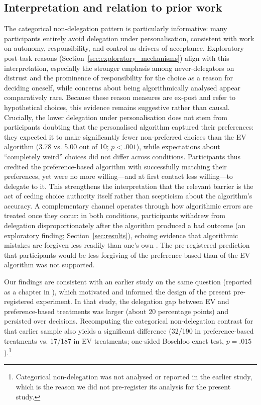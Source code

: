 \documentclass[a4paper, 12pt, fleqn]{article}
\theoremstyle{hypstyle}
\begin{document}
\subsection{Interpretation and relation to prior work}\label{sec:interpretation}
The categorical non-delegation pattern is particularly informative: many participants entirely avoid delegation under personalisation, consistent with work on autonomy, responsibility, and control as drivers of acceptance. Exploratory post-task reasons (Section~\ref{sec:exploratory_mechanisms}) align with this interpretation, especially the stronger emphasis among never-delegators on distrust and the prominence of responsibility for the choice as a reason for deciding oneself, while concerns about being algorithmically analysed appear comparatively rare. Because these reason measures are ex-post and refer to hypothetical choices, this evidence remains suggestive rather than causal. Crucially, the lower delegation under personalisation does not stem from participants doubting that the personalised algorithm captured their preferences: they expected it to make significantly fewer non-preferred choices than the EV algorithm (3.78 vs. 5.00 out of 10; $p < .001$), while expectations about ``completely weird'' choices did not differ across conditions. Participants thus credited the preference-based algorithm with successfully matching their preferences, yet were no more willing---and at first contact less willing---to delegate to it. This strengthens the interpretation that the relevant barrier is the act of ceding choice authority itself rather than scepticism about the algorithm's accuracy. A complementary channel operates through how algorithmic errors are treated once they occur: in both conditions, participants withdrew from delegation disproportionately after the algorithm produced a bad outcome (an exploratory finding; Section~\ref{sec:results}), echoing evidence that algorithmic mistakes are forgiven less readily than one's own \citep{Dietvorst2018,Renier2021}. The pre-registered prediction that participants would be less forgiving of the preference-based than of the EV algorithm was not supported.

Our findings are consistent with an earlier study on the same question (reported as a chapter in \citealp{suraci_2024}), which motivated and informed the design of the present pre-registered experiment. In that study, the delegation gap between EV and preference-based treatments was larger (about 20 percentage points) and persisted over decisions. Recomputing the categorical non-delegation contrast for that earlier sample also yields a significant difference (32/190 in preference-based treatments vs. 17/187 in EV treatments; one-sided Boschloo exact test, $p = .015$).\footnote{Categorical non-delegation was not analysed or reported in the earlier study, which is the reason we did not pre-register its analysis for the present study.}
\end{document}
